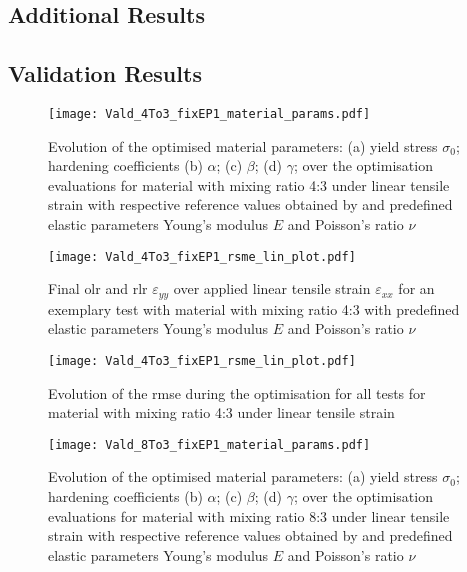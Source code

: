 \begin{appendices}
    \chapter{Additional Results} \label{app:additionalResults}
    \section{Validation Results} \label{app:verifResults}

    \begin{figure}[H]
    \centering
    \texttt{[image: Vald\_4To3\_fixEP1\_material\_params.pdf]}
    \caption{Evolution of the optimised material parameters: (a) yield stress $\sigma_0$; hardening coefficients (b) $\alpha$; (c) $\beta$; (d) $\gamma$; over the optimisation evaluations for material with mixing ratio 4:3 under linear tensile strain with respective reference values obtained by \citet{ries_deciphering_nodate} and predefined elastic parameters Young's modulus $E$ and Poisson's ratio $\nu$}
    \label{fig:material_params_4to3}
    \end{figure}
    
    \begin{figure}[H]
    \centering
    \texttt{[image: Vald\_4To3\_fixEP1\_rsme\_lin\_plot.pdf]}
    \caption{Final \acrlong{olr} and \acrfull{rlr} $\varepsilon_{yy}$ over applied linear tensile strain $\varepsilon_{xx}$ for an exemplary test with material with mixing ratio 4:3 with predefined elastic parameters Young's modulus $E$ and Poisson's ratio $\nu$}
    \label{fig:strain_strain_4to3}
    \end{figure}

    \begin{figure}[H]
    \centering
    \texttt{[image: Vald\_4To3\_fixEP1\_rsme\_lin\_plot.pdf]}
    \caption{Evolution of the \acrfull{rmse} during the optimisation for all tests for material with mixing ratio 4:3 under linear tensile strain}
    \label{fig:verfifRMSE43}
    \end{figure}

    \begin{figure}[H]
    \centering
    \texttt{[image: Vald\_8To3\_fixEP1\_material\_params.pdf]}
    \caption{Evolution of the optimised material parameters: (a) yield stress $\sigma_0$; hardening coefficients (b) $\alpha$; (c) $\beta$; (d) $\gamma$; over the optimisation evaluations for material with mixing ratio 8:3 under linear tensile strain with respective reference values obtained by \citet{ries_deciphering_nodate} and predefined elastic parameters Young's modulus $E$ and Poisson's ratio $\nu$}
    \label{fig:material_params_8to3}
    \end{figure}


\end{appendices}
